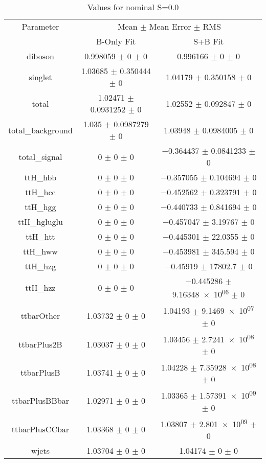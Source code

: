 \begin{table}
\centering
\caption{Values for nominal S=0.0}
\begin{tabular}{ccc}
\toprule
Parameter & \multicolumn{2}{c}{Mean $\pm$ Mean Error $\pm$ RMS}\\
 & B-Only Fit & S+B Fit\\
\midrule
diboson & \num{0.998059} $\pm$ \num{0} $\pm$ \num{0} & \num{0.996166} $\pm$ \num{0} $\pm$ \num{0}\\
singlet & \num{1.03685} $\pm$ \num{0.350444} $\pm$ \num{0} & \num{1.04179} $\pm$ \num{0.350158} $\pm$ \num{0}\\
total & \num{1.02471} $\pm$ \num{0.0931252} $\pm$ \num{0} & \num{1.02552} $\pm$ \num{0.092847} $\pm$ \num{0}\\
total\_background & \num{1.035} $\pm$ \num{0.0987279} $\pm$ \num{0} & \num{1.03948} $\pm$ \num{0.0984005} $\pm$ \num{0}\\
total\_signal & \num{0} $\pm$ \num{0} $\pm$ \num{0} & \num{-0.364437} $\pm$ \num{0.0841233} $\pm$ \num{0}\\
ttH\_hbb & \num{0} $\pm$ \num{0} $\pm$ \num{0} & \num{-0.357055} $\pm$ \num{0.104694} $\pm$ \num{0}\\
ttH\_hcc & \num{0} $\pm$ \num{0} $\pm$ \num{0} & \num{-0.452562} $\pm$ \num{0.323791} $\pm$ \num{0}\\
ttH\_hgg & \num{0} $\pm$ \num{0} $\pm$ \num{0} & \num{-0.440733} $\pm$ \num{0.841694} $\pm$ \num{0}\\
ttH\_hgluglu & \num{0} $\pm$ \num{0} $\pm$ \num{0} & \num{-0.457047} $\pm$ \num{3.19767} $\pm$ \num{0}\\
ttH\_htt & \num{0} $\pm$ \num{0} $\pm$ \num{0} & \num{-0.445301} $\pm$ \num{22.0355} $\pm$ \num{0}\\
ttH\_hww & \num{0} $\pm$ \num{0} $\pm$ \num{0} & \num{-0.453981} $\pm$ \num{345.594} $\pm$ \num{0}\\
ttH\_hzg & \num{0} $\pm$ \num{0} $\pm$ \num{0} & \num{-0.45919} $\pm$ \num{17802.7} $\pm$ \num{0}\\
ttH\_hzz & \num{0} $\pm$ \num{0} $\pm$ \num{0} & \num{-0.445286} $\pm$ \num{9.16348e+06} $\pm$ \num{0}\\
ttbarOther & \num{1.03732} $\pm$ \num{0} $\pm$ \num{0} & \num{1.04193} $\pm$ \num{9.1469e+07} $\pm$ \num{0}\\
ttbarPlus2B & \num{1.03037} $\pm$ \num{0} $\pm$ \num{0} & \num{1.03456} $\pm$ \num{2.7241e+08} $\pm$ \num{0}\\
ttbarPlusB & \num{1.03741} $\pm$ \num{0} $\pm$ \num{0} & \num{1.04228} $\pm$ \num{7.35928e+08} $\pm$ \num{0}\\
ttbarPlusBBbar & \num{1.02971} $\pm$ \num{0} $\pm$ \num{0} & \num{1.03365} $\pm$ \num{1.57391e+09} $\pm$ \num{0}\\
ttbarPlusCCbar & \num{1.03368} $\pm$ \num{0} $\pm$ \num{0} & \num{1.03807} $\pm$ \num{2.801e+09} $\pm$ \num{0}\\
wjets & \num{1.03704} $\pm$ \num{0} $\pm$ \num{0} & \num{1.04174} $\pm$ \num{0} $\pm$ \num{0}\\
\bottomrule
\end{tabular}
\end{table}